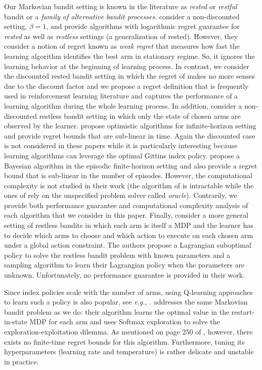 Our Markovian bandit setting is known in the literature as \emph{rested} or \emph{restful} bandit or a \emph{family of alternative bandit processes}. \cite{tekin2012online} consider a non-discounted setting, $\beta=1$, and provide algorithms with logarithmic regret guarantee for \emph{rested}  as well as  \emph{restless} settings (a generalization of rested).
However, they consider a notion of regret known as \emph{weak regret} that measures how fast the learning algorithm identifies the best arm in stationary regime. So, it ignores the learning behavior at the beginning of learning process.
In contrast, we consider the discounted rested bandit setting in which the regret of \cite{tekin2012online} makes no more senses due to the discount factor and we propose a regret definition that is frequently used in reinforcement learning literature and captures the performance of a learning algorithm during the whole learning process.
In addition, \cite{ortner2012regret, jung2019regret, wang2020restless} consider a non-discounted restless bandit setting in which only the state of chosen arms are observed by the learner. \cite{ortner2012regret, wang2020restless} propose optimistic algorithms for infinite-horizon setting and provide regret bounds that are sub-linear in time. Again the discounted case is not considered in these papers while it is particularly interesting  because learning algorithms can leverage the optimal Gittins index policy.
\cite{jung2019regret} propose a Bayesian algorithm in the episodic finite-horizon setting and also provide a regret bound that is sub-linear in the number of episodes. However, the computational complexity is not studied in their work (the algorithm of \cite{ortner2012regret} is intractable while the ones of \cite{jung2019regret, wang2020restless} rely on the unspecified problem solver called \emph{oracle}).
Contrarily, we provide both performance guarantee and computational complexity analysis of each algorithm that we consider in this paper.
Finally, \cite{killian2021beyond} consider a more general setting of restless bandits in which each arm is itself a MDP and the learner has to decide which arms to choose and which action to execute on  each chosen arm under a  global action constraint. The authors propose a Lagrangian suboptimal policy to solve the restless bandit problem with known parameters and a sampling algorithm to learn their Lagrangian policy when the parameters are unknown. Unfortunately, no performance guarantee is provided in their work.

Since index policies  scale with the number of arms, using Q-learning approaches
to learn such a policy is also popular, see \emph{e.g.},
\cite{avrachenkov2022whittle,fu2019towards,duff1995q}. \cite{duff1995q} addresses the same Markovian bandit
problem as we do: their algorithm learns the optimal value in the
restart-in-state MDP \cite{katehakis1987multi} for each
arm and uses Softmax exploration to solve the exploration-exploitation
dilemma. As mentioned on page $250$ of
\cite{auer2002finite}, however, there exists no
finite-time regret bounds for this algorithm. Furthermore, tuning
its hyperparameters (learning rate and temperature) is rather delicate and
unstable  in practice. 

